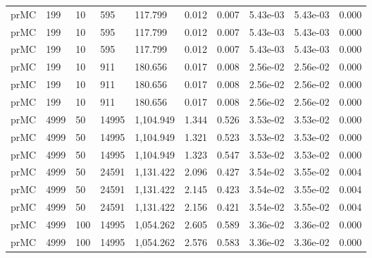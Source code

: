 \begin{tabular}{llllllllll}
prMC &    199 &         10 &         595 &   117.799 &                        0.012 &          0.007 &         5.43e-03 &        5.43e-03 &        0.000 \\
prMC &    199 &         10 &         595 &   117.799 &                        0.012 &          0.007 &         5.43e-03 &        5.43e-03 &        0.000 \\
prMC &    199 &         10 &         595 &   117.799 &                        0.012 &          0.007 &         5.43e-03 &        5.43e-03 &        0.000 \\
prMC &    199 &         10 &         911 &   180.656 &                        0.017 &          0.008 &         2.56e-02 &        2.56e-02 &        0.000 \\
prMC &    199 &         10 &         911 &   180.656 &                        0.017 &          0.008 &         2.56e-02 &        2.56e-02 &        0.000 \\
prMC &    199 &         10 &         911 &   180.656 &                        0.017 &          0.008 &         2.56e-02 &        2.56e-02 &        0.000 \\
prMC &   4999 &         50 &       14995 & 1,104.949 &                        1.344 &          0.526 &         3.53e-02 &        3.53e-02 &        0.000 \\
prMC &   4999 &         50 &       14995 & 1,104.949 &                        1.321 &          0.523 &         3.53e-02 &        3.53e-02 &        0.000 \\
prMC &   4999 &         50 &       14995 & 1,104.949 &                        1.323 &          0.547 &         3.53e-02 &        3.53e-02 &        0.000 \\
prMC &   4999 &         50 &       24591 & 1,131.422 &                        2.096 &          0.427 &         3.54e-02 &        3.55e-02 &        0.004 \\
prMC &   4999 &         50 &       24591 & 1,131.422 &                        2.145 &          0.423 &         3.54e-02 &        3.55e-02 &        0.004 \\
prMC &   4999 &         50 &       24591 & 1,131.422 &                        2.156 &          0.421 &         3.54e-02 &        3.55e-02 &        0.004 \\
prMC &   4999 &        100 &       14995 & 1,054.262 &                        2.605 &          0.589 &         3.36e-02 &        3.36e-02 &        0.000 \\
prMC &   4999 &        100 &       14995 & 1,054.262 &                        2.576 &          0.583 &         3.36e-02 &        3.36e-02 &        0.000 \\

\end{tabular}
